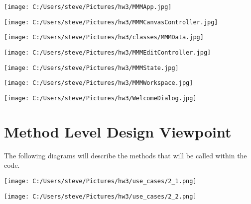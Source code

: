 \documentclass[10pt,a4paper]{article}
\begin{document}
\begin{center}
\texttt{[image: C:/Users/steve/Pictures/hw3/MMMApp.jpg]}
\end{center}

\begin{center}
\texttt{[image: C:/Users/steve/Pictures/hw3/MMMCanvasController.jpg]}
\end{center}

\begin{center}
\texttt{[image: C:/Users/steve/Pictures/hw3/classes/MMMData.jpg]}
\end{center}

\begin{center}
\texttt{[image: C:/Users/steve/Pictures/hw3/MMMEditController.jpg]}
\end{center}

\begin{center}
\texttt{[image: C:/Users/steve/Pictures/hw3/MMMState.jpg]}
\end{center}

\begin{center}
\texttt{[image: C:/Users/steve/Pictures/hw3/MMMWorkspace.jpg]}
\end{center}

\begin{center}
\texttt{[image: C:/Users/steve/Pictures/hw3/WelcomeDialog.jpg]}
\end{center}

\newpage

\section{Method Level Design Viewpoint}
The following diagrams will describe the methods that will be called within the code.

\begin{center}
\texttt{[image: C:/Users/steve/Pictures/hw3/use\_cases/2\_1.png]}
\end{center}

\begin{center}
\texttt{[image: C:/Users/steve/Pictures/hw3/use\_cases/2\_2.png]}
\end{center}
\end{document}
